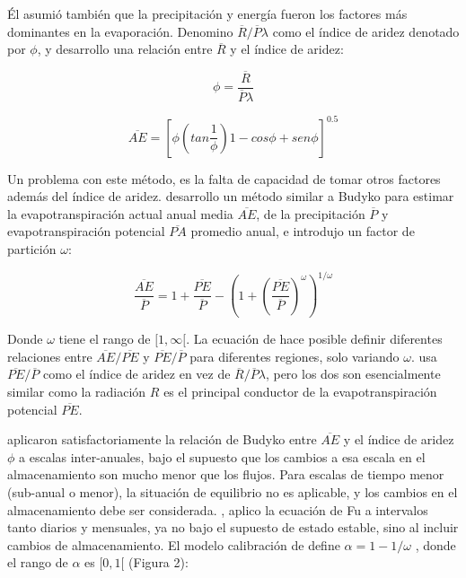 \documentclass[12pt]{article}
\begin{document}
Él asumió también que la precipitación y energía fueron los factores más dominantes en la evaporación. Denomino $\overline{R}/\overline{P}\lambda$ como el índice de aridez denotado por $\phi$, y desarrollo una relación entre $\overline{R}$ y el índice de aridez:

\begin{equation}
\phi = \frac{\overline{R}}{\overline{P}\lambda}
\end{equation}

\begin{equation}
\overline{AE} = \left [ \phi\left ( tan\frac{1}{\phi}  \right )1 - cos\phi + sen\phi \right ]^{0.5}
\end{equation}

Un problema con este método, es la falta de capacidad de tomar otros factores además del índice de aridez. \citet{Fu1981} desarrollo un método similar a Budyko para estimar la evapotranspiración actual anual media $\overline{AE}$, de la precipitación $\overline{P}$ y evapotranspiración potencial $\overline{PA}$ promedio anual, e introdujo un factor de partición $\omega$: 

\begin{equation}
\frac{\overline{AE}}{\overline{P}} = 1 + \frac{\overline{PE}}{\overline{P}} - \left (1 + \left ( \frac{\overline{PE}}{\overline{P}} \right )^{\omega}  \right )^{1/\omega}
\label{equ:fuEqu}
\end{equation}

Donde $\omega$ tiene el rango de $[1,\infty[$. La ecuación de \citet{Fu1981} hace posible definir diferentes relaciones entre $\overline{AE}/\overline{PE}$ y $\overline{PE}/\overline{P}$ para diferentes regiones, solo variando $\omega$. \citet{Fu1981} usa $\overline{PE}/\overline{P}$ como el índice de aridez en vez de $\overline{R}/\overline{P}\lambda$, pero los dos son esencialmente similar como la radiación $R$ es el principal conductor de la evapotranspiración potencial $\overline{PE}$.

\citet{Koster1999} aplicaron satisfactoriamente la relación de Budyko entre $\overline{AE}$ y el índice de aridez $\phi$ a escalas inter-anuales, bajo el supuesto que los cambios a esa escala en el almacenamiento son mucho menor que los flujos. Para escalas de tiempo menor (sub-anual o menor), la situación de equilibrio no es aplicable, y los cambios en el almacenamiento debe ser considerada. \citet{Zhang2008}, aplico la ecuación de Fu a intervalos tanto diarios y mensuales, ya no bajo el supuesto de estado estable, sino al incluir cambios de almacenamiento. El modelo calibración de \citet{Zhang2008} define $\alpha = 1 - 1/\omega$ , donde el rango de $\alpha$ es $[0,1[$ (Figura 2):
\end{document}
